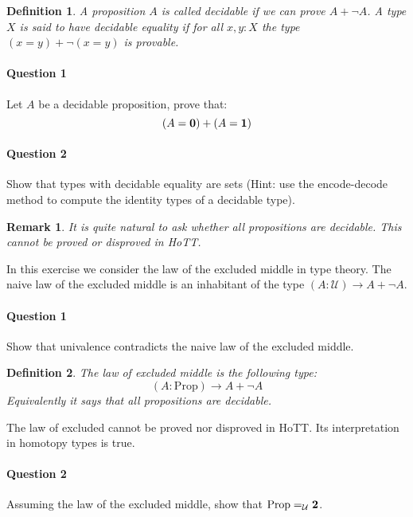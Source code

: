 \documentclass{article}[6pt]%
\newcommand{\U}{{\mathcal U}}
\renewcommand{\r}{\rightarrow}
\newcommand{\one}{{\bf 1}}
\newcommand{\zero}{{\bf 0}}
\newcommand{\two}{{\bf 2}}
\newcommand{\Prop}{\mathrm{Prop}}
\newtheorem{definition}{Definition}
\newtheorem{remark}{Remark}
\begin{document}
\begin{Exercise}[title={Decidable types and propositions}]


\begin{definition}
A proposition $A$ is called decidable if we can prove $A+\lnot A$. A type $X$ is said to have decidable equality if for all $x,y:X$ the type $(x=y)+\lnot(x=y)$ is provable.
\end{definition}

\paragraph{Question 1} Let $A$ be a decidable proposition, prove that:
\[(A=\zero) + (A=\one)\]

\paragraph{Question 2} Show that types with decidable equality are sets (Hint: use the encode-decode method to compute the identity types of a decidable type).

\begin{remark}
It is quite natural to ask whether all propositions are decidable. This cannot be proved or disproved in HoTT.
\end{remark}

\end{Exercise}


\begin{Exercise}[title={The law of the excluded middle}]
In this exercise we consider the law of the excluded middle in type theory. The naive law of the excluded middle is an inhabitant of the type $(A:\U)\r A+\lnot A$.

\paragraph{Question 1} Show that univalence contradicts the naive law of the excluded middle.

\begin{definition}
The law of excluded middle is the following type:
\[(A:\Prop)\r A + \lnot A\]
Equivalently it says that all propositions are decidable.
\end{definition}

The law of excluded cannot be proved nor disproved in HoTT. Its interpretation in homotopy types is true. 

\paragraph{Question 2} Assuming the law of the excluded middle, show that $\Prop =_\U \two$.

\end{Exercise}
\end{document}
